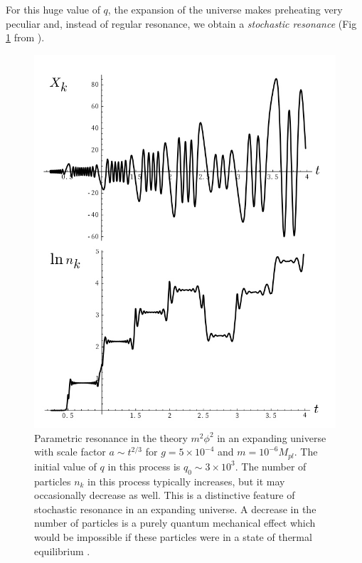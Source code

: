 \documentclass[11pt,a4paper,twoside]{book}
\begin{document}
For this huge value of $ q $, the expansion of the universe makes preheating very peculiar and, instead of regular resonance, we obtain a  \textit{stochastic resonance} (Fig \ref{fig:lindefig4} from \cite{Chap4:LindePreheatingModel}).
\begin{figure}
	\centering
	\includegraphics[width=0.6\linewidth, height=0.4\textheight]{Images/Chap4/Linde_Fig4}
	\caption{Parametric resonance in the theory $ m^{2}\phi^{2} $ in an expanding universe with scale factor $ a\sim t^{2/3}$ for $g=5\times 10^{-4} $ and $ m=10^{-6} M_{pl} $. The initial value of $ q $ in this process is $ q_{0}\sim 3 \times 10^{3} $.	The number of particles  $ n_{k} $ in this process typically increases, but it may occasionally decrease as well. This is a distinctive feature of stochastic resonance in an expanding universe. A decrease in the number of particles is a purely quantum mechanical effect which would be impossible if these particles were in a state of thermal equilibrium \cite{Chap4:LindePreheatingModel}.}
	\label{fig:lindefig4}
\end{figure}
\end{document}
